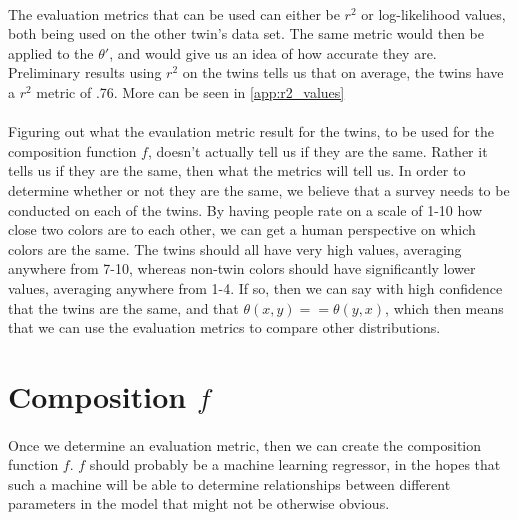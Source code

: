\documentclass[12pt, letterpaper]{article}
\begin{document}
\paragraph{} The evaluation metrics that can be used can either be $r^2$ or log-likelihood values, both being used on the other twin's data set. The same metric would then be applied to the $\theta'$, and would give us an idea of how accurate they are. Preliminary results using $r^2$ on the twins tells us that on average, the twins have a $r^2$ metric of .76. More can be seen in \autoref{app:r2_values}

\paragraph{} Figuring out what the evaulation metric result for the twins, to be used for the composition function $f$, doesn't actually tell us if they are the same. Rather it tells us if they are the same, then what the metrics will tell us. In order to determine whether or not they are the same, we believe that a survey needs to be conducted on each of the twins. By having people rate on a scale of 1-10 how close two colors are to each other, we can get a human perspective on which colors are the same. The twins should all have very high values, averaging anywhere from 7-10, whereas non-twin colors should have significantly lower values, averaging anywhere from 1-4. If so, then we can say with high confidence that the twins are the same, and that $\theta(x,y) == \theta(y, x)$, which then means that we can use the evaluation metrics to compare other distributions.

\section{Composition $f$}

\paragraph{} Once we determine an evaluation metric, then we can create the composition function $f$. $f$ should probably be a machine learning regressor, in the hopes that such a machine will be able to determine relationships between different parameters in the model that might not be otherwise obvious.
\end{document}
